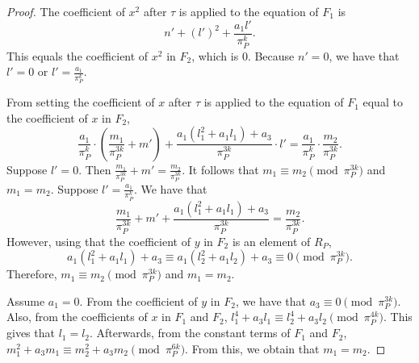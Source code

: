 \documentclass[10pt,a4paper]{amsart}
\begin{document}
\begin{proof}
The coefficient of $x^2$ after $\tau$ is applied to the equation of $F_1$ is
\[
n'+(l')^2+\frac{a_1l'}{\pi_P^k}.
\]
This equals the coefficient of $x^2$ in $F_2$, which is $0$. Because $n'=0$, we have that $l'=0$ or $l'=\frac{a_1}{\pi_P^k}$.

From setting the coefficient of $x$ after $\tau$ is applied to the equation of $F_1$ equal to the coefficient of $x$ in $F_2$,
\[
\frac{a_1}{\pi_P^k}\cdot\left(\frac{m_1}{\pi_P^{3k}}+m'\right)+\frac{a_1(l_1^2+a_1l_1)+a_3}{\pi_P^{3k}}\cdot l'=\frac{a_1}{\pi_P^k}\cdot\frac{m_2}{\pi_P^{3k}}.
\]
Suppose $l'=0$. Then $\frac{m_1}{\pi_P^{3k}}+m'=\frac{m_2}{\pi_P^{3k}}$. It follows that $m_1\equiv m_2\pmod{\pi_P^{3k}}$ and $m_1=m_2$. Suppose $l'=\frac{a_1}{\pi_P^k}$. We have that
\[
\frac{m_1}{\pi_P^{3k}}+m'+\frac{a_1(l_1^2+a_1l_1)+a_3}{\pi_P^{3k}}=\frac{m_2}{\pi_P^{3k}}.
\]
However, using that the coefficient of $y$ in $F_2$ is an element of $R_P$,
\[
a_1(l_1^2+a_1l_1)+a_3\equiv a_1(l_2^2+a_1l_2)+a_3\equiv 0\pmod{\pi_P^{3k}}.
\]
Therefore, $m_1\equiv m_2\pmod{\pi_P^{3k}}$ and $m_1=m_2$.

Assume $a_1=0$. From the coefficient of $y$ in $F_2$, we have that $a_3\equiv 0\pmod{\pi_P^{3k}}$. Also, from the coefficients of $x$ in $F_1$ and $F_2$,
$l_1^4+a_3l_1\equiv l_2^4+a_3l_2\pmod{\pi_P^{4k}}$.
This gives that $l_1=l_2$. Afterwards, from the constant terms of $F_1$ and $F_2$, $m_1^2+a_3m_1\equiv m_2^2+a_3m_2\pmod{\pi_P^{6k}}$. From this, we obtain that $m_1=m_2$.
\end{proof}
\end{document}
